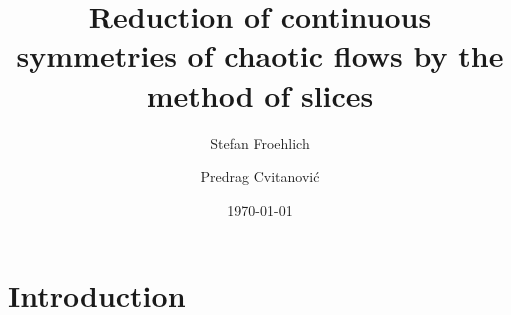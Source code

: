 \documentclass[final,3p,times,sort&compress]{elsarticle}	%
\begin{document}
\title{Reduction of continuous symmetries of chaotic flows
       by the method of slices}

\author{Stefan Froehlich}

\author{Predrag Cvitanovi\'{c}}

\address{Center for Nonlinear Science,
        School of Physics, Georgia Institute of Technology,
        Atlanta, GA 30332-0430}

\date{\today}

\begin{abstract}
    
\end{abstract}


\maketitle %


%

\section{Introduction}
    \label{sec:intro}
    
\end{document}
